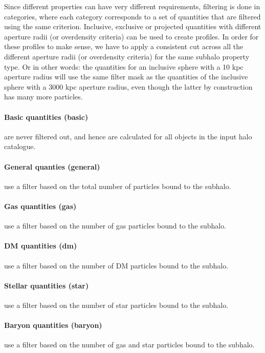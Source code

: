 \documentclass{article}
\begin{document}
Since different properties can have very different requirements, filtering is done in categories, where each 
category corresponds to a set of quantities that are filtered using the same criterion. Inclusive, exclusive 
or projected quantities with different aperture radii (or overdensity criteria) can be used to create 
profiles. In order for these profiles to make sense, we have to apply a consistent cut across all the 
different aperture radii (or overdensity criteria) for the same subhalo property type. Or in other words: the 
quantities for an inclusive sphere with a 10 kpc aperture radius will use the same filter mask as the 
quantities of the inclusive sphere with a 3000 kpc aperture radius, even though the latter by construction has 
many more particles.

\paragraph{Basic quantities (basic)} are never filtered out, and hence are calculated for all objects in the
input halo catalogue.

\paragraph{General quanties (general)} use a filter based on the total number of particles bound to the 
subhalo.

\paragraph{Gas quantities (gas)} use a filter based on the number of gas particles bound to the subhalo. 

\paragraph{DM quantities (dm)} use a filter based on the number of DM particles bound to the subhalo.

\paragraph{Stellar quantities (star)} use a filter based on the number of star particles bound to the 
subhalo.

\paragraph{Baryon quantities (baryon)} use a filter based on the number of gas and star particles 
bound to the subhalo.
\end{document}

